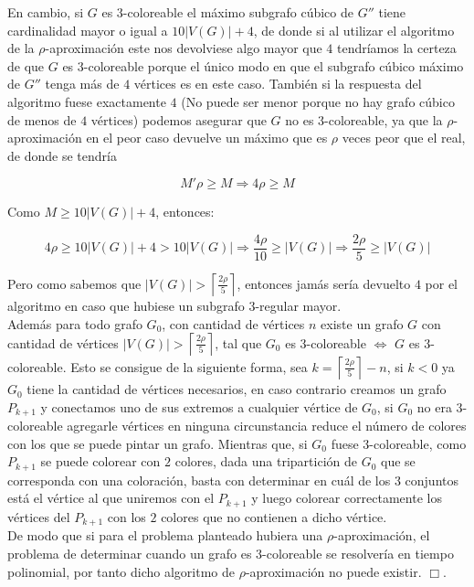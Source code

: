 \documentclass{article}
\begin{document}
En cambio, si $G$ es $3$-coloreable el m\'aximo subgrafo c\'ubico de $G''$ tiene cardinalidad mayor o igual a $10|V(G)| + 4$, de donde si al utilizar el algoritmo de la $\rho$-aproximaci\'on 
este nos devolviese algo mayor que $4$ tendr\'iamos la certeza de que $G$ es $3$-coloreable porque el \'unico modo en que el subgrafo c\'ubico m\'aximo de $G''$ tenga m\'as de $4$ v\'ertices es en este caso. Tambi\'en si 
la respuesta del algoritmo fuese exactamente $4$ (No puede ser menor porque no hay grafo c\'ubico de menos de $4$ v\'ertices) podemos asegurar que $G$ no es $3$-coloreable, ya que la $\rho$-aproximaci\'on en el peor caso devuelve un m\'aximo que es $\rho$ veces 
peor que el real, de donde se tendr\'ia 

$$M'\rho \geq M \Rightarrow 4\rho \geq M$$

Como $M \geq 10|V(G)| + 4$, entonces: 

$$4\rho \geq 10|V(G)| + 4 > 10|V(G)| \Rightarrow \frac{4\rho}{10} \geq |V(G)| \Rightarrow \frac{2\rho}{5} \geq |V(G)|$$

Pero como sabemos que $|V(G)| >  \left\lceil\frac{2\rho}{5} \right\rceil $, entonces jam\'as ser\'ia devuelto $4$ por el algoritmo en caso que hubiese un subgrafo $3$-regular mayor.\\ 

Adem\'as para todo grafo $G_0$, con cantidad de v\'ertices $n$ existe un grafo $G$ con cantidad de v\'ertices $|V(G)| >  \left\lceil\frac{2\rho}{5} \right\rceil $, tal que $G_0$ es $3$-coloreable $\Leftrightarrow$ $G$ es $3$-coloreable. Esto se consigue de la 
siguiente forma, sea $k = \left\lceil\frac{2\rho}{5} \right\rceil - n$, si $k < 0$ ya $G_0$ tiene la cantidad de v\'ertices necesarios, en caso contrario creamos un grafo $P_{k+1}$ y conectamos uno de sus extremos a cualquier v\'ertice de $G_0$, si $G_0$ no era $3$-coloreable 
agregarle v\'ertices en ninguna circunstancia reduce el n\'umero de colores con los que se puede pintar un grafo. Mientras que, si $G_0$ fuese $3$-coloreable, como $P_{k+1}$ se puede colorear con $2$ colores, dada una tripartici\'on de $G_0$ que se corresponda con una coloraci\'on, basta con determinar en 
cuál de los $3$ conjuntos est\'a el v\'ertice al que uniremos con el $P_{k+1}$ y luego colorear correctamente los v\'ertices del $P_{k+1}$ con los $2$ colores que no contienen a dicho v\'ertice.\\ 

De modo que si para el problema planteado hubiera una $\rho$-aproximaci\'on, el problema de determinar cuando un grafo es $3$-coloreable se resolver\'ia en tiempo polinomial, por tanto dicho algoritmo de $\rho$-aproximaci\'on no 
puede existir. $\Box $.
\end{document}
